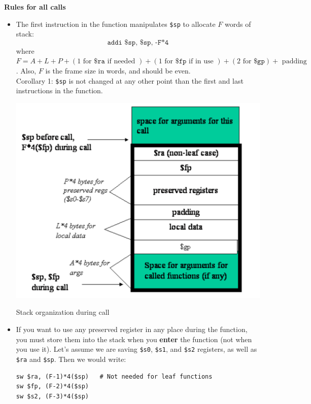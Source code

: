 \documentclass[10pt]{article}
\begin{document}
\textbf{Rules for all calls}
\begin{itemize}
\item The first instruction in the function manipulates \texttt{\$sp} to allocate $F$ words of stack:
  \[\texttt{addi \$sp, \$sp, -F*4}\]
  where $F = A + L + P + (1 \text{ for } \texttt{\$ra} \text{ if needed }) + (1 \text{ for } \texttt{\$fp} \text{ if in use }) + (2 \text{ for } \texttt{\$gp}) + \text{ padding }$. Also, $F$ is the frame size in words, and should be even.\\
  Corollary 1: \texttt{\$sp} is not changed at any other point than the first and last instructions in the function.
\begin{marginfigure}
  \begin{center}
    \includegraphics[width=\linewidth]{17.png}
  \end{center}
  \caption{Stack organization during call}
\end{marginfigure}%
\item If you want to use any preserved register in any place during the function, you must store them into the stack when you \textbf{enter} the function (not when you use it). Let's assume we are saving \texttt{\$s0}, \texttt{\$s1}, and \texttt{\$s2} registers, as well as \texttt{\$ra} and \texttt{\$sp}. Then we would write:
\begin{lstlisting}[style=CStyle, numbers=none, xleftmargin=5.0ex, aboveskip=1em, belowskip=1em, numberstyle=\color{blue}, escapeinside=||]
sw $ra, (F-1)*4($sp)   # Not needed for leaf functions
sw $fp, (F-2)*4($sp)
sw $s2, (F-3)*4($sp)

\end{lstlisting}
\end{itemize}
\end{document}
